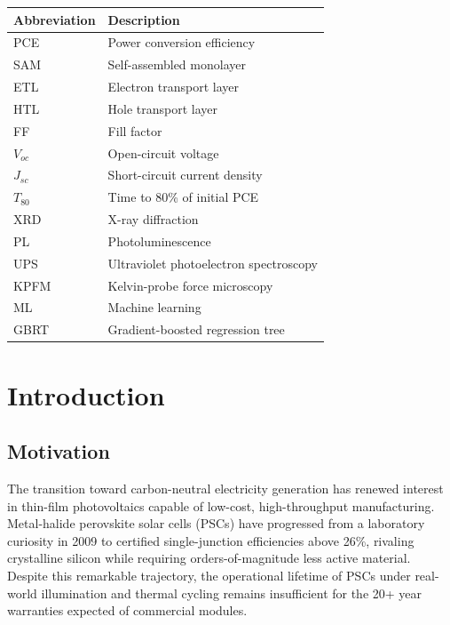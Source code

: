 \documentclass[12pt,a4paper,oneside]{report}
\begin{document}
\begin{center}
\renewcommand{\arraystretch}{1.3}
\begin{tabular}{@{}ll@{}}
\toprule
\textbf{Abbreviation} & \textbf{Description} \\
\midrule
PCE & Power conversion efficiency \\
SAM & Self-assembled monolayer \\
ETL & Electron transport layer \\
HTL & Hole transport layer \\
FF & Fill factor \\
$V_{oc}$ & Open-circuit voltage \\
$J_{sc}$ & Short-circuit current density \\
$T_{80}$ & Time to 80\% of initial PCE \\
XRD & X-ray diffraction \\
PL & Photoluminescence \\
UPS & Ultraviolet photoelectron spectroscopy \\
KPFM & Kelvin-probe force microscopy \\
ML & Machine learning \\
GBRT & Gradient-boosted regression tree \\
\bottomrule
\end{tabular}
\end{center}

\clearpage


\chapter{Introduction}

\section{Motivation}

The transition toward carbon-neutral electricity generation has renewed
interest in thin-film photovoltaics capable of low-cost, high-throughput
manufacturing. Metal-halide perovskite solar cells (PSCs) have progressed
from a laboratory curiosity in 2009 to certified single-junction
efficiencies above 26\%, rivaling crystalline silicon while requiring
orders-of-magnitude less active material. Despite this remarkable
trajectory, the operational lifetime of PSCs under real-world illumination
and thermal cycling remains insufficient for the 20+ year warranties
expected of commercial modules.
\end{document}
